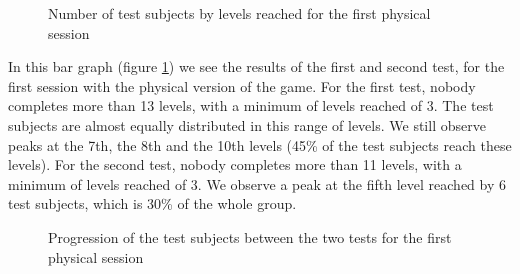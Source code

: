 \documentclass[12pt, openany, twocolumn]{article}
\begin{document}
                \begin{figure}[H]
                    \centering
                    \setlength{\fboxsep}{0pt}
                    \caption{Number of test subjects by levels reached for the first physical session}
                    \label{figure7}
                \end{figure}
            In this bar graph (figure \ref{figure7}) we see the results of the first and second test, for the first session with the physical version of the game.
            For the first test, nobody completes more than 13 levels, with a minimum of levels reached of 3.
            The test subjects are almost equally distributed in this range of levels.  
            We still observe peaks at the 7th, the 8th and the 10th levels (45\% of the test subjects reach these levels).
            For the second test, nobody completes more than 11 levels, with a minimum of levels reached of 3. 
            We observe a peak at the fifth level reached by 6 test subjects, which is 30\% of the whole group.
            \\
        
                \begin{figure}[H]
                    \centering
                    \setlength{\fboxsep}{0pt}
                    \caption{Progression of the test subjects between the two tests for the first physical session}
                    \label{figure8}
                \end{figure}
\end{document}
